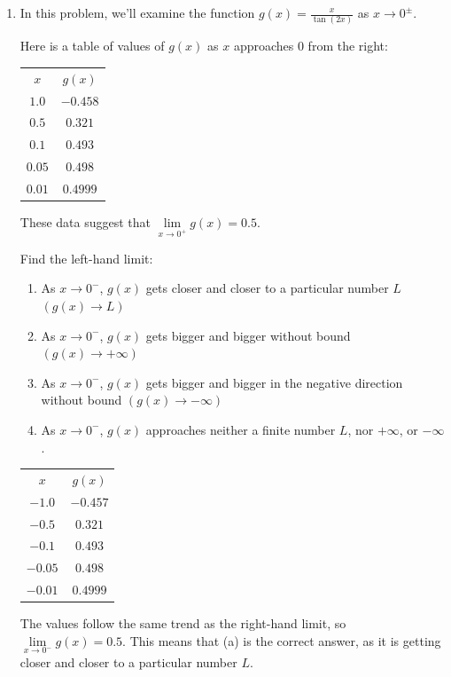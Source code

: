 \documentclass{article}
\begin{document}
\begin{enumerate}
    \item In this problem, we'll examine the function $g(x) = \frac{x}{\tan(2x)}$ as $x \rightarrow 0^{\pm}$.

Here is a table of values of $g(x)$ as $x$ approaches $0$ from the right:
\begin{center}
    \begin{tabular} { c|c }
        $x$ & $g(x)$\\
        \cline{1-2}
        $1.0$ & $-0.458$\\
        $0.5$ & $0.321$\\
        $0.1$ & $0.493$\\
        $0.05$ & $0.498$\\
        $0.01$ & $0.4999$
    \end{tabular}
\end{center}

These data suggest that $\underset{x \rightarrow 0^{+}}{\lim} g(x) = 0.5$.

Find the left-hand limit:
    \begin{enumerate}
        \item As $x \rightarrow 0^{-}$, $g(x)$ gets closer and closer to a particular number $L$
            $\left(g(x) \rightarrow L\right)$
        \item As $x \rightarrow 0^{-}$, $g(x)$ gets bigger and bigger without bound
            $\left(g(x) \rightarrow +\infty\right)$
        \item As $x \rightarrow 0^{-}$, $g(x)$ gets bigger and bigger in the negative direction without bound
            $\left(g(x) \rightarrow -\infty\right)$
        \item As $x \rightarrow 0^{-}$, $g(x)$ approaches neither a finite number $L$, nor $+\infty$, or $-\infty$.
    \end{enumerate}
\begin{center}
    \begin{tabular} { c|c }
        $x$ & $g(x)$\\
        \cline{1-2}
        $-1.0$ & $-0.457$\\
        $-0.5$ & $0.321$\\
        $-0.1$ & $0.493$\\
        $-0.05$ & $0.498$\\
        $-0.01$ & $0.4999$
    \end{tabular}
\end{center}
The values follow the same trend as the right-hand limit, so $\underset{x \rightarrow 0^{-}}{\lim} g(x) = 0.5$.
This means that (a) is the correct answer, as it is getting closer and closer to a particular number $L$.


\end{enumerate}
\end{document}
